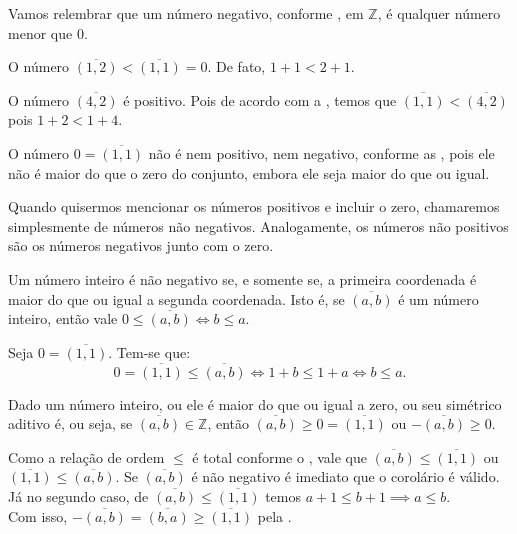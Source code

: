 \documentclass[../main.tex]{subfiles}
\begin{document}
Vamos relembrar que um número negativo, conforme , em $\mathbb{Z}$, é qualquer número menor que $0$.
\begin{ex}
    O número $\overline{(1,2)} < \overline{(1,1)} = 0$. De fato, $1+1 < 2+1$. 
\end{ex}
\begin{ex}
    O número $\overline{(4,2)}$ é positivo. Pois de acordo com a , temos que $\overline{(1,1)} < \overline{(4,2)}$ pois 
    $1+2 < 1+4$.
\end{ex}
\begin{ex}
    O número $0 = \overline{(1,1)}$ não é nem positivo, nem negativo, conforme as , pois ele não é maior do que o zero do conjunto, embora ele seja maior do que ou igual.
\end{ex}
\begin{ex}
    Quando quisermos mencionar os números positivos e incluir o zero, chamaremos simplesmente de números não negativos. Analogamente, os números não positivos são os números negativos junto com o zero.
\end{ex}

\begin{prop}\label{int-prop-coordenadaMaior}
    Um número inteiro é não negativo se, e somente se, a primeira coordenada é maior do que ou igual a segunda coordenada. 
    Isto é, se $\overline{(a,b)}$ é um número inteiro, então vale $0 \leq \overline{(a,b)}  \iff b \leq a$.
\end{prop}
\begin{dem}
    Seja $0 = \overline{(1,1)}$. Tem-se que:
    \[ 0 = \overline{(1,1)} \leq \overline{(a,b)} \iff 1+b \leq 1+a \iff b \leq a. \]
\end{dem}

\begin{corol}\label{int-corol-numeroOuSimetricoPositivo}
    Dado um número inteiro, ou ele é maior do que ou igual a zero, ou seu simétrico aditivo é, ou seja,
    se $\overline{(a,b)} \in \mathbb{Z}$, então $\overline{(a,b)} \geq 0 = \overline{(1,1)}$ ou $-\overline{(a,b)} \geq 0$.
\end{corol}
\begin{dem}
    Como a relação de ordem $\leq$ é total conforme o , vale que $\overline{(a,b)} \leq \overline{(1,1)}$ ou $\overline{(1,1)} \leq \overline{(a,b)}$. Se $\overline{(a,b)}$ é não negativo é imediato que o corolário é válido. Já no segundo caso, 
    de $\overline{(a,b)} \leq \overline{(1,1)}$ temos $a+1 \leq b+1 \implies a \leq b$. \\
    Com isso, $-\overline{(a,b)} = \overline{(b,a)} \geq \overline{(1,1)}$ pela .
\end{dem}
\end{document}
